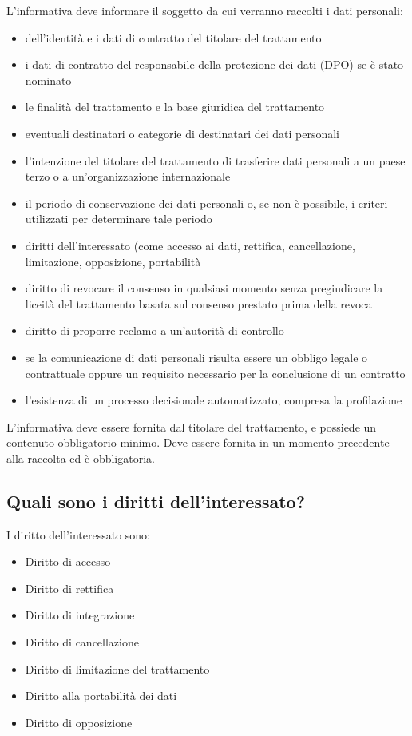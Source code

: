 L'informativa deve informare il soggetto da cui verranno raccolti i dati personali:
\begin{itemize}
    \item dell'identità e i dati di contratto del titolare del trattamento
    \item i dati di contratto del responsabile della protezione dei dati (DPO) se è stato nominato
    \item le finalità del trattamento e la base giuridica del trattamento
    \item eventuali destinatari o categorie di destinatari dei dati personali
    \item l'intenzione del titolare del trattamento di trasferire dati personali a un paese terzo o a un'organizzazione internazionale
    \item il periodo di conservazione dei dati personali o, se non è possibile, i criteri utilizzati per determinare tale periodo
    \item diritti dell'interessato (come accesso ai dati, rettifica, cancellazione, limitazione, opposizione, portabilità
    \item diritto di revocare il consenso in qualsiasi momento senza pregiudicare la liceità del trattamento basata sul consenso prestato prima della revoca
    \item diritto di proporre reclamo a un'autorità di controllo
    \item se la comunicazione di dati personali risulta essere un obbligo legale o contrattuale oppure un requisito necessario per la conclusione di un contratto
    \item l'esistenza di un processo decisionale automatizzato, compresa la profilazione
\end{itemize}
L'informativa deve essere fornita dal titolare del trattamento, e possiede un contenuto obbligatorio minimo.
Deve essere fornita in un momento precedente alla raccolta ed è obbligatoria.

\subsection{Quali sono i diritti dell’interessato?}
I diritto dell'interessato sono:
\begin{itemize}
    \item Diritto di accesso
    \item Diritto di rettifica
    \item Diritto di integrazione
    \item Diritto di cancellazione
    \item Diritto di limitazione del trattamento
    \item Diritto alla portabilità dei dati
    \item Diritto di opposizione
\end{itemize}

